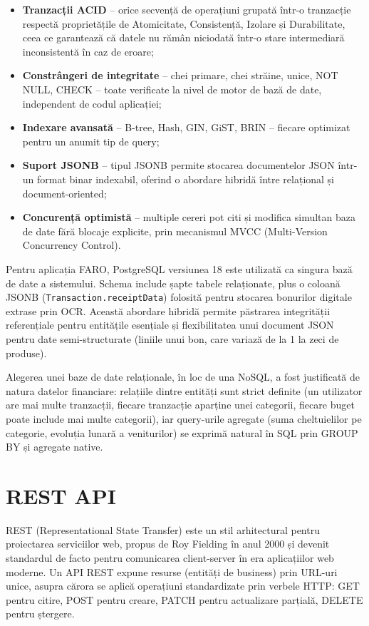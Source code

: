 \documentclass[12pt,a4paper,oneside]{report}
\begin{document}
\begin{itemize}[leftmargin=2cm,itemsep=2pt]
  \item \textbf{Tranzacții ACID} -- orice secvență de operațiuni grupată într-o tranzacție respectă proprietățile de Atomicitate, Consistență, Izolare și Durabilitate, ceea ce garantează că datele nu rămân niciodată într-o stare intermediară inconsistentă în caz de eroare;
  \item \textbf{Constrângeri de integritate} -- chei primare, chei străine, unice, NOT NULL, CHECK -- toate verificate la nivel de motor de bază de date, independent de codul aplicației;
  \item \textbf{Indexare avansată} -- B-tree, Hash, GIN, GiST, BRIN -- fiecare optimizat pentru un anumit tip de query;
  \item \textbf{Suport JSONB} -- tipul JSONB permite stocarea documentelor JSON într-un format binar indexabil, oferind o abordare hibridă între relațional și document-oriented;
  \item \textbf{Concurență optimistă} -- multiple cereri pot citi și modifica simultan baza de date fără blocaje explicite, prin mecanismul MVCC (Multi-Version Concurrency Control).
\end{itemize}

Pentru aplicația FARO, PostgreSQL versiunea 18 este utilizată ca singura bază de date a sistemului. Schema include șapte tabele relaționate, plus o coloană JSONB (\texttt{Transaction.receiptData}) folosită pentru stocarea bonurilor digitale extrase prin OCR. Această abordare hibridă permite păstrarea integrității referențiale pentru entitățile esențiale și flexibilitatea unui document JSON pentru date semi-structurate (liniile unui bon, care variază de la 1 la zeci de produse).

Alegerea unei baze de date relaționale, în loc de una NoSQL, a fost justificată de natura datelor financiare: relațiile dintre entități sunt strict definite (un utilizator are mai multe tranzacții, fiecare tranzacție aparține unei categorii, fiecare buget poate include mai multe categorii), iar query-urile agregate (suma cheltuielilor pe categorie, evoluția lunară a veniturilor) se exprimă natural în SQL prin GROUP BY și agregate native.

\section{REST API}

REST (Representational State Transfer) este un stil arhitectural pentru proiectarea serviciilor web, propus de Roy Fielding în anul 2000 și devenit standardul de facto pentru comunicarea client-server în era aplicațiilor web moderne. Un API REST expune resurse (entități de business) prin URL-uri unice, asupra cărora se aplică operațiuni standardizate prin verbele HTTP: GET pentru citire, POST pentru creare, PATCH pentru actualizare parțială, DELETE pentru ștergere. \cite{ref:rest}
\end{document}
